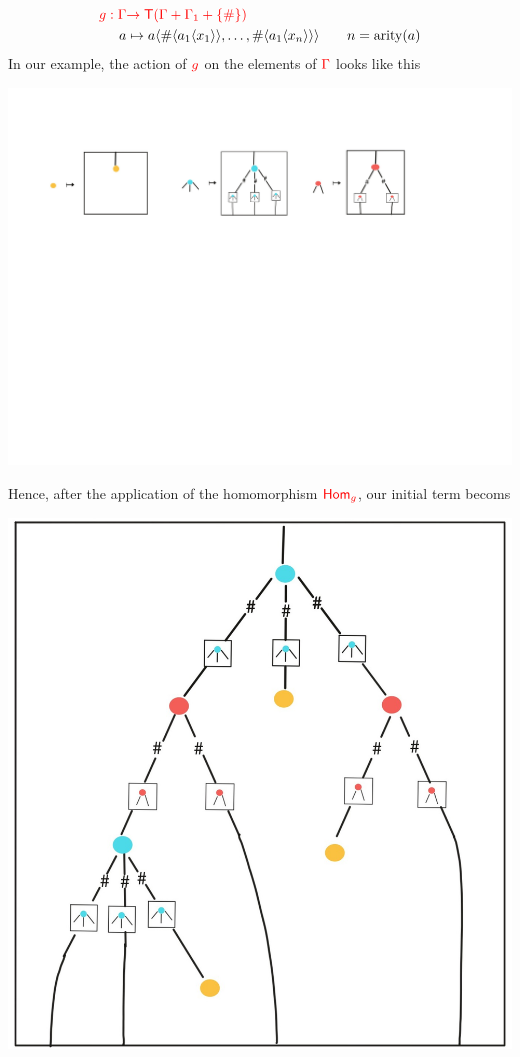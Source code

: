 \begin{example}
\begin{enumerate}
\begin{align*}
{\color{red}{g: \Gamma}} & {\color{red}{\to  {\color{red}{\mathsf T}}(\Gamma+\Gamma_1+\{\#\} )}}\\
      a & \mapsto a\langle{\#\langle{a_1\langle{x_1}\rangle}\rangle,\dots, \#\langle{a_1\langle{x_n}\rangle}\rangle}\rangle\qquad n=\mathrm{arity}(a)
\end{align*}
In our example, the action of ${\color{red}{g}}$ on the elements of ${\color{red}{\Gamma}}$ looks like this
\begin{center}
		\includegraphics[scale=.15]{MyPic3.jpg}
				\end{center}
Hence, after the application of the homomorphism ${\color{red}{\mathsf{Hom}_g}}$, our initial term becoms
\begin{center}
		\includegraphics[scale=.15]{MyPic4.jpg}

\end{center}
\end{enumerate}
\end{example}
